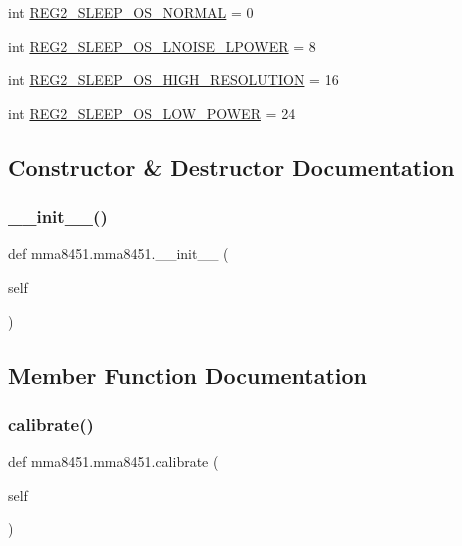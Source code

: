 \begin{DoxyCompactItemize}
\item 
int \hyperlink{classmma8451_1_1mma8451_a74aec4b06d390918a83a2a7989aa5db2}{R\+E\+G2\+\_\+\+S\+L\+E\+E\+P\+\_\+\+O\+S\+\_\+\+N\+O\+R\+M\+AL} = 0
\item 
int \hyperlink{classmma8451_1_1mma8451_a8bb6bdfb2c23b8648aeeefb358df6527}{R\+E\+G2\+\_\+\+S\+L\+E\+E\+P\+\_\+\+O\+S\+\_\+\+L\+N\+O\+I\+S\+E\+\_\+\+L\+P\+O\+W\+ER} = 8
\item 
int \hyperlink{classmma8451_1_1mma8451_aedb7d70ce73e28d19c3d01e968fd4b3c}{R\+E\+G2\+\_\+\+S\+L\+E\+E\+P\+\_\+\+O\+S\+\_\+\+H\+I\+G\+H\+\_\+\+R\+E\+S\+O\+L\+U\+T\+I\+ON} = 16
\item 
int \hyperlink{classmma8451_1_1mma8451_a9ff0d64dbc477357f9e60f5268dc8af6}{R\+E\+G2\+\_\+\+S\+L\+E\+E\+P\+\_\+\+O\+S\+\_\+\+L\+O\+W\+\_\+\+P\+O\+W\+ER} = 24
\end{DoxyCompactItemize}


\subsection{Constructor \& Destructor Documentation}
\mbox{\label{classmma8451_1_1mma8451_a778d5e81d0ed420045ef46e4e63ec2b8}} 
\subsubsection{\texorpdfstring{\+\_\+\+\_\+init\+\_\+\+\_\+()}{\_\_init\_\_()}}
{\footnotesize\ttfamily def mma8451.\+mma8451.\+\_\+\+\_\+init\+\_\+\+\_\+ (\begin{DoxyParamCaption}\item[{}]{self }\end{DoxyParamCaption})}



\subsection{Member Function Documentation}
\mbox{\label{classmma8451_1_1mma8451_add58736fe80c5107ff4db30cff538222}} 
\subsubsection{\texorpdfstring{calibrate()}{calibrate()}}
{\footnotesize\ttfamily def mma8451.\+mma8451.\+calibrate (\begin{DoxyParamCaption}\item[{}]{self }\end{DoxyParamCaption})}

